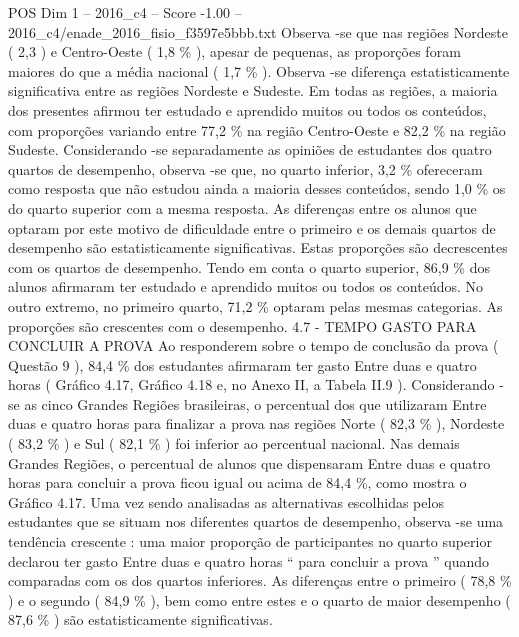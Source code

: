 \begin{textsample}{POS Dim 1 – 2016\_c4 – Score -1.00 – 2016\_c4/enade\_2016\_fisio\_f3597e5bbb.txt}
Observa -se que nas regiões Nordeste ( 2,3 ) e Centro-Oeste ( 1,8 \% ), apesar de pequenas, as proporções foram maiores do que a média nacional ( 1,7 \% ).
Observa -se diferença estatisticamente significativa entre as regiões Nordeste e Sudeste.
Em todas as regiões, a maioria dos presentes afirmou ter estudado e aprendido muitos ou todos os conteúdos, com proporções variando entre 77,2 \% na região Centro-Oeste e 82,2 \% na região Sudeste.
Considerando -se separadamente as opiniões de estudantes dos quatro quartos de desempenho, observa -se que, no quarto inferior, 3,2 \% ofereceram como resposta que não estudou ainda a maioria desses conteúdos, sendo 1,0 \% os do quarto superior com a mesma resposta.
As diferenças entre os alunos que optaram por este motivo de dificuldade entre o primeiro e os demais quartos de desempenho são estatisticamente significativas.
Estas proporções são decrescentes com os quartos de desempenho.
Tendo em conta o quarto superior, 86,9 \% dos alunos afirmaram ter estudado e aprendido muitos ou todos os conteúdos.
No outro extremo, no primeiro quarto, 71,2 \% optaram pelas mesmas categorias.
As proporções são crescentes com o desempenho. 4.7 - TEMPO GASTO PARA CONCLUIR A PROVA Ao responderem sobre o tempo de conclusão da prova ( Questão 9 ), 84,4 \% dos estudantes afirmaram ter gasto Entre duas e quatro horas ( Gráfico 4.17, Gráfico 4.18 e, no Anexo II, a Tabela II.9 ).
Considerando -se as cinco Grandes Regiões brasileiras, o percentual dos que utilizaram Entre duas e quatro horas para finalizar a prova nas regiões Norte ( 82,3 \% ), Nordeste ( 83,2 \% ) e Sul ( 82,1 \% ) foi inferior ao percentual nacional.
Nas demais Grandes Regiões, o percentual de alunos que dispensaram Entre duas e quatro horas para concluir a prova ficou igual ou acima de 84,4 \%, como mostra o Gráfico 4.17.
Uma vez sendo analisadas as alternativas escolhidas pelos estudantes que se situam nos diferentes quartos de desempenho, observa -se uma tendência crescente : uma maior proporção de participantes no quarto superior declarou ter gasto Entre duas e quatro horas “ para concluir a prova ” quando comparadas com os dos quartos inferiores.
As diferenças entre o primeiro ( 78,8 \% ) e o segundo ( 84,9 \% ), bem como entre estes e o quarto de maior desempenho ( 87,6 \% ) são estatisticamente significativas.

\end{textsample}
